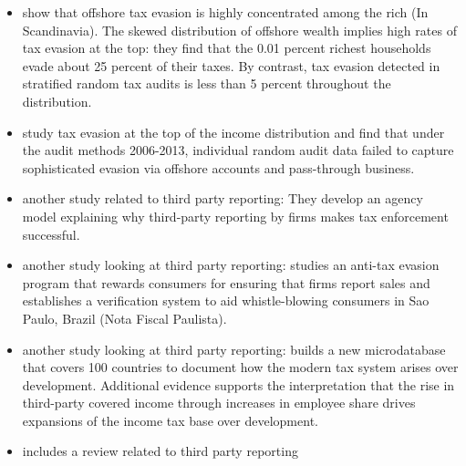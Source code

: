 \documentclass[12pt]{article}
\begin{document}
\begin{itemize}
    \item \textcite{alstadsaeter2019tax} show that offshore tax evasion is highly concentrated among the rich (In Scandinavia). The skewed distribution of offshore wealth implies high rates of tax evasion at the top: they find that the 0.01 percent richest households evade about 25 percent of their taxes. By contrast, tax evasion detected in stratified random tax audits is less than 5 percent throughout the distribution.
    \item \textcite{guyton2021tax} study tax evasion at the top of the income distribution and find that under the audit methods 2006-2013, individual random audit data failed to capture sophisticated evasion via offshore accounts and pass-through business.
    \item \textcite{kleven2016can} another study related to third party reporting: They develop an agency model explaining why third-party reporting by firms makes tax enforcement successful. 
    \item \textcite{naritomi2019consumers} another study looking at third party reporting: studies an anti-tax evasion program that rewards consumers for ensuring that firms report sales and establishes a verification system to aid whistle-blowing consumers in Sao Paulo, Brazil (Nota Fiscal Paulista).
    \item \textcite{jensen2022employment} another study looking at third party reporting: builds a new microdatabase that covers 100 countries to document how the modern tax system arises over development. Additional evidence supports the interpretation that the rise in third-party covered income through increases in employee share drives expansions of the income tax base over development.
    \item \textcite{slemrod2019tax} includes a review related to third party reporting 
\end{itemize}
\\
\end{document}
